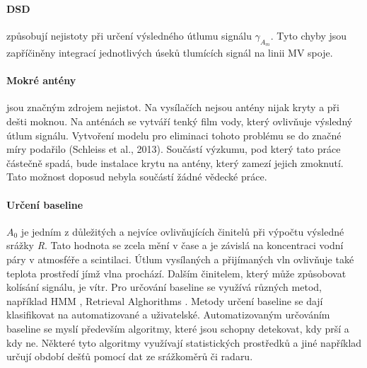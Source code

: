 \documentclass[a4paper,12pt]{article}
\begin{document}
\paragraph*{DSD} způsobují nejistoty při určení výsledného útlumu signálu \emph{$\gamma_{A_{m}} $}. Tyto chyby jsou zapříčiněny integrací jednotlivých úseků tlumících signál na linii MV spoje. \cite{mv1}

\paragraph*{Mokré antény}jsou značným zdrojem nejistot. Na vysílačích nejsou antény nijak kryty a při dešti moknou. Na anténách se vytváří tenký film vody, který ovlivňuje výsledný útlum signálu. Vytvoření modelu pro eliminaci tohoto problému se do značné míry podařilo (Schleiss et al., 2013)\cite{wetat}. Součástí výzkumu, pod který tato práce částečně spadá, bude instalace krytu na antény, který zamezí jejich zmoknutí. Tato možnost doposud nebyla součástí žádné vědecké práce.

\paragraph*{Určení baseline } \emph{ $A_{0}$ } je jedním z důležitých a nejvíce ovlivňujících činitelů při výpočtu výsledné srážky \emph{R}. Tato hodnota se zcela mění v čase a je závislá na koncentraci vodní páry v atmosféře a scintilaci. Útlum vysílaných a přijímaných vln ovlivňuje také teplota prostředí jímž vlna prochází. Dalším činitelem, který může způsobovat kolísání signálu, je vítr.
Pro určování baseline se využívá různých metod, například \acs{HMM} \cite{comparsinmv}, Retrieval Alghorithms \cite{countryw}. Metody určení baseline se dají klasifikovat na automatizované a uživatelské. Automatizovaným určováním baseline se myslí především algoritmy, které jsou schopny detekovat, kdy prší a kdy ne. Některé tyto algoritmy využívají statistických prostředků a jiné například určují období dešťů pomocí dat ze srážkoměrů \cite{countryw} či radaru. 
\end{document}
